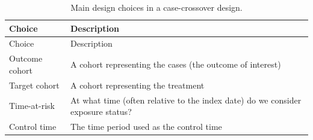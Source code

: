\documentclass[]{book}
\begin{document}
\begin{longtable}[]{@{}ll@{}}
\caption{\label{tab:ccrChoices} Main design choices in a case-crossover
design.}\tabularnewline
\toprule
\begin{minipage}[b]{0.23\columnwidth}\raggedright\strut
Choice\strut
\end{minipage} & \begin{minipage}[b]{0.71\columnwidth}\raggedright\strut
Description\strut
\end{minipage}\tabularnewline
\midrule
\endfirsthead
\toprule
\begin{minipage}[b]{0.23\columnwidth}\raggedright\strut
Choice\strut
\end{minipage} & \begin{minipage}[b]{0.71\columnwidth}\raggedright\strut
Description\strut
\end{minipage}\tabularnewline
\midrule
\endhead
\begin{minipage}[t]{0.23\columnwidth}\raggedright\strut
Outcome cohort\strut
\end{minipage} & \begin{minipage}[t]{0.71\columnwidth}\raggedright\strut
A cohort representing the cases (the outcome of interest)\strut
\end{minipage}\tabularnewline
\begin{minipage}[t]{0.23\columnwidth}\raggedright\strut
Target cohort\strut
\end{minipage} & \begin{minipage}[t]{0.71\columnwidth}\raggedright\strut
A cohort representing the treatment\strut
\end{minipage}\tabularnewline
\begin{minipage}[t]{0.23\columnwidth}\raggedright\strut
Time-at-risk\strut
\end{minipage} & \begin{minipage}[t]{0.71\columnwidth}\raggedright\strut
At what time (often relative to the index date) do we consider exposure
status?\strut
\end{minipage}\tabularnewline
\begin{minipage}[t]{0.23\columnwidth}\raggedright\strut
Control time\strut
\end{minipage} & \begin{minipage}[t]{0.71\columnwidth}\raggedright\strut
The time period used as the control time\strut
\end{minipage}\tabularnewline
\bottomrule
\end{longtable}
\end{document}
